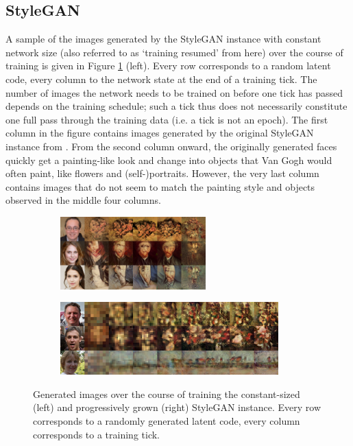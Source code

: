 \documentclass{article}
\begin{document}
\subsection{StyleGAN}
A sample of the images generated by the StyleGAN instance with constant network size (also referred to as `training resumed' from here) over the course of training is given in Figure \ref{fig:morphing} (left). Every row corresponds to a random latent code, every column to the network state at the end of a training tick. The number of images the network needs to be trained on before one tick has passed depends on the training schedule; such a tick thus does not necessarily constitute one full pass through the training data (i.e. a tick is not an epoch). The first column in the figure contains images generated by the original StyleGAN instance from \cite{karras2019stylebased}. From the second column onward, the originally generated faces quickly get a painting-like look and change into objects that Van Gogh would often paint, like flowers and (self-)portraits. However, the very last column contains images that do not seem to match the painting style and objects observed in the middle four columns.

\begin{figure}
    \centering
    \begin{subfigure}[b]{0.35\linewidth}
        \includegraphics[height=2.8cm]{report/img/morphing.png}
    \end{subfigure}
    \hfill
    \begin{subfigure}[b]{0.6\linewidth}
        \includegraphics[height=2.8cm]{report/img/retrain_morphing.png}
    \end{subfigure}
    \caption{Generated images over the course of training the constant-sized (left) and progressively grown (right) StyleGAN instance. Every row corresponds to a randomly generated latent code, every column corresponds to a training tick.}
    \label{fig:morphing}
\end{figure}
\end{document}

